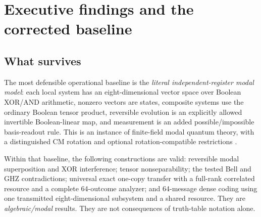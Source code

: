 \documentclass[11pt,a4paper]{article}
\theoremstyle{definition}\newtheorem{definition}[theorem]{Definition}
\begin{document}
\section{Executive findings and the corrected baseline}
\subsection{What survives}
The most defensible operational baseline is the \emph{literal independent-register modal model}: each local system has an eight-dimensional vector space over Boolean XOR/AND arithmetic, nonzero vectors are states, composite systems use the ordinary Boolean tensor product, reversible evolution is an explicitly allowed invertible Boolean-linear map, and measurement is an added possible/impossible basis-readout rule. This is an instance of finite-field modal quantum theory, with a distinguished CM rotation and optional rotation-compatible restrictions \cite{schumacher2011,james2011}.

Within that baseline, the following constructions are valid: reversible modal superposition and XOR interference; tensor nonseparability; the tested Bell and GHZ contradictions; universal exact one-copy transfer with a full-rank correlated resource and a complete 64-outcome analyzer; and 64-message dense coding using one transmitted eight-dimensional subsystem and a shared resource. They are \emph{algebraic/modal} results. They are not consequences of truth-table notation alone.
\end{document}
